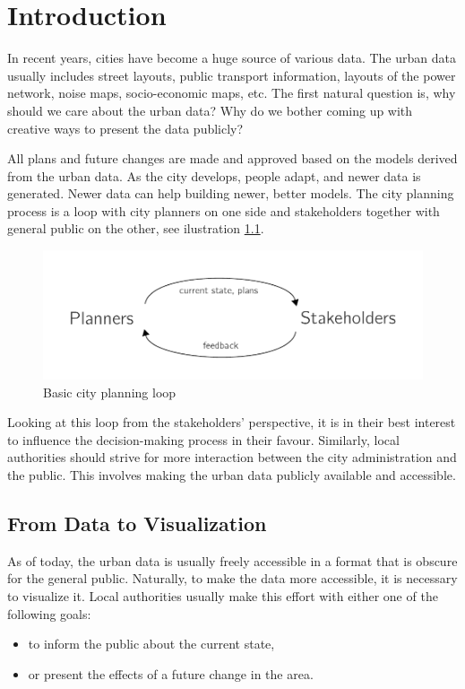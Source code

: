 \chapter{Introduction}
In recent years, cities have become a huge source of various data. The urban data usually includes street layouts, public transport information, layouts of the power network, noise maps, socio-economic maps, etc. The first natural question is, why should we care about the urban data? Why do we bother coming up with creative ways to present the data publicly?

All plans and future changes are made and approved based on the models derived from the urban data. As the city develops, people adapt, and newer data is generated. Newer data can help building newer, better models. The city planning process is a loop with city planners on one side and stakeholders together with general public on the other, see ilustration \ref{fig:loop1}.  

\begin{figure}[h]
    \centering
    \includegraphics[width=0.7\linewidth]{figures/Loop1.pdf}
    \caption{Basic city planning loop}
    \label{fig:loop1}
\end{figure}

Looking at this loop from the stakeholders' perspective, it is in their best interest to influence the decision-making process in their favour. Similarly, local authorities should strive for more interaction between the city administration and the public. This involves making the urban data publicly available and accessible.

\section{From Data to Visualization}
As of today, the urban data is usually freely accessible in a format that is obscure for the general public. Naturally, to make the data more accessible, it is necessary to visualize it. Local authorities usually make this effort with either one of the following goals: 
\begin{itemize}
    \item to inform the public about the current state,
    \item or present the effects of a future change in the area.
\end{itemize}

